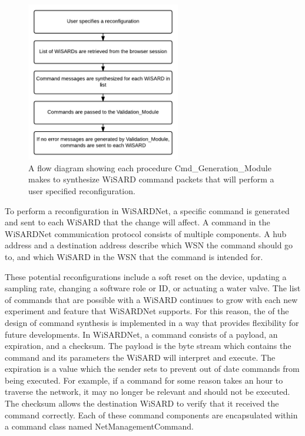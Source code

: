 \begin{figure}[H]
	\centering
	\includegraphics[width=0.6\textwidth]{figures/flow_diagram_cmd_module.png}
	\caption{A flow diagram showing each procedure Cmd\_Generation\_Module makes to synthesize WiSARD command packets that will perform a user specified reconfiguration.}
	\label{fig:flow_cmd_generator}
\end{figure}

To perform a reconfiguration in WiSARDNet, a specific command is generated and sent to each WiSARD that the change will affect. A command in the WiSARDNet communication protocol consists of multiple components. A hub address and a destination address describe which WSN the command should go to, and which WiSARD in the WSN that the command is intended for.

These potential reconfigurations include a soft reset on the device, updating a sampling rate, changing a software role or ID, or actuating a water valve. The list of commands that are possible with a WiSARD continues to grow with each new experiment and feature that WiSARDNet supports. For this reason, the of the design of command synthesis is implemented in a way that provides flexibility for future developments. In WiSARDNet, a command consists of a payload, an expiration, and a checksum. The payload is the byte stream which contains the command and its parameters the WiSARD will interpret and execute. The expiration is a value which the sender sets to prevent out of date commands from being executed. For example, if a command for some reason takes an hour to traverse the network, it may no longer be relevant and should not be executed. The checksum allows the destination WiSARD to verify that it received the command correctly. Each of these command components are encapsulated within a command class named NetManagementCommand.

